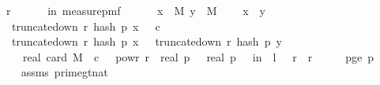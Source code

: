 \begin{isabellebody}
\ \ \ {\isachardoublequoteopen}r\ {\isasymge}\ {}{\isachardoublequoteclose}\isanewline
\ \ \ {\isachardoublequoteopen}{\isasymP}{\isacharparenleft}{\kern0pt}{\isasymomega}\ in\ measure{\isacharunderscore}{\kern0pt}pmf\ {\isasymOmega}{\isachardot}{\kern0pt}\ \isanewline
\ \ \ \ {\isasymexists}x\ {\isasymin}\ M{\isachardot}{\kern0pt}\ {\isasymexists}y\ {\isasymin}\ M{\isachardot}{\kern0pt}\isanewline
\ \ \ \ x\ {\isasymnoteq}\ y\ {\isasymand}\isanewline
\ \ \ \ truncate{\isacharunderscore}{\kern0pt}down\ r\ {\isacharparenleft}{\kern0pt}hash\ p\ x\ {\isasymomega}{\isacharparenright}{\kern0pt}\ {\isasymle}\ c\ {\isasymand}\isanewline
\ \ \ \ truncate{\isacharunderscore}{\kern0pt}down\ r\ {\isacharparenleft}{\kern0pt}hash\ p\ x\ {\isasymomega}{\isacharparenright}{\kern0pt}\ {\isacharequal}{\kern0pt}\ truncate{\isacharunderscore}{\kern0pt}down\ r\ {\isacharparenleft}{\kern0pt}hash\ p\ y\ {\isasymomega}{\isacharparenright}{\kern0pt}{\isacharparenright}{\kern0pt}\ {\isasymle}\ \isanewline
\ \ \ \ {}\ {\isacharasterisk}{\kern0pt}\ {\isacharparenleft}{\kern0pt}real\ {\isacharparenleft}{\kern0pt}card\ M{\isacharparenright}{\kern0pt}{\isacharparenright}{\kern0pt}\ {\isacharasterisk}{\kern0pt}\ c\ {\isacharasterisk}{\kern0pt}\ {}\ powr\ {\isacharminus}{\kern0pt}r\ {\isacharslash}{\kern0pt}\ {\isacharparenleft}{\kern0pt}real\ p{\isacharparenright}{\kern0pt}\ \ {\isacharplus}{\kern0pt}\ {}{\isacharslash}{\kern0pt}real\ p{\isachardoublequoteclose}\ {\isacharparenleft}{\kern0pt}\ {\isachardoublequoteopen}{\isasymP}{\isacharparenleft}{\kern0pt}{\isasymomega}\ in\ {\isacharunderscore}{\kern0pt}{\isachardot}{\kern0pt}\ {\isacharquery}{\kern0pt}l\ {\isasymomega}{\isacharparenright}{\kern0pt}\ {\isasymle}\ {\isacharquery}{\kern0pt}r{}\ {\isacharplus}{\kern0pt}\ {\isacharquery}{\kern0pt}r{}{\isachardoublequoteclose}{\isacharparenright}{\kern0pt}\isanewline
%
\isadelimproof
%
\endisadelimproof
%
\isatagproof
{}\isamarkupfalse%
\ {\isacharminus}{\kern0pt}\isanewline
\ \ \isamarkupfalse%
\ p{\isacharunderscore}{\kern0pt}ge{\isacharunderscore}{\kern0pt}{}{\isacharcolon}{\kern0pt}\ {\isachardoublequoteopen}p\ {\isachargreater}{\kern0pt}\ {}{\isachardoublequoteclose}\isanewline
\ \ \ \ \isamarkupfalse%
\ assms\ prime{\isacharunderscore}{\kern0pt}gt{\isacharunderscore}{\kern0pt}{}{\isacharunderscore}{\kern0pt}nat\ \isamarkupfalse%

\end{isabellebody}
